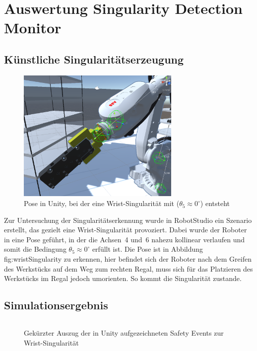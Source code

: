\newpage
\section{Auswertung Singularity Detection Monitor}
\label{sec:singularityauswertung}

\subsection{Künstliche Singularitätserzeugung}
\begin{figure}[H]
  \centering
  \includegraphics[width=0.7\textwidth]{figures/wristSingularity.png}
  \caption{Pose in Unity, bei der eine Wrist-Singularität mit
  ($\theta_{5} \approx 0^\circ$) entsteht}
  \label{fig:wristSingularity}
\end{figure}

Zur Untersuchung der Singularitätserkennung wurde in RobotStudio ein
Szenario erstellt,
das gezielt eine Wrist-Singularität provoziert. Dabei wurde der
Roboter in eine Pose
geführt, in der die Achsen~4 und~6 nahezu kollinear verlaufen und
somit die Bedingung
$\theta_{5} \approx 0^\circ$ erfüllt ist. Die Pose ist in Abbildung
{fig:wristSingularity} zu erkennen, hier befindet sich der Roboter nach dem
Greifen des Werkstücks auf dem Weg zum rechten Regal, muss sich für das
Platzieren des Werkstücks im Regal jedoch umorienten. So kommt die Singularität
zustande.

\subsection{Simulationsergebnis}
\begin{figure}[H]
  \inputminted[fontsize=\footnotesize,breaklines]{json}{code-snippets/singularityerror.json}
  \caption{Gekürzter Auszug der in Unity aufgezeichneten Safety
  Events zur Wrist-Singularität}
  \label{lst:singularity_json}
\end{figure}

